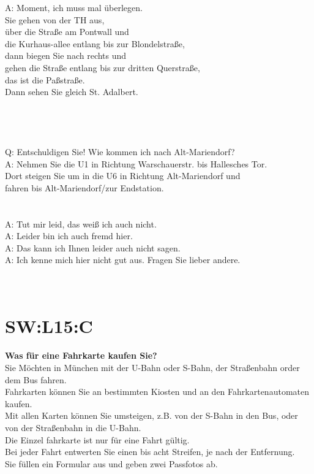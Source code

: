 A: Moment, ich muss mal überlegen. \\
Sie gehen von der TH aus, \\
über die Straße am Pontwall und \\
die Kurhaus-allee entlang bis zur Blondelstraße, \\
dann biegen Sie nach rechts und \\
gehen die Straße entlang bis zur dritten Querstraße, \\
das ist die Paßstraße. \\
Dann sehen Sie gleich St. Adalbert. \\
\\
\\
\noindent
\\
\\
Q: Entschuldigen Sie! Wie kommen ich nach Alt-Mariendorf? \\
A: Nehmen Sie die U1 in Richtung Warschauerstr. bis Hallesches Tor.  \\
Dort steigen Sie um in die U6 in Richtung Alt-Mariendorf und \\
fahren bis Alt-Mariendorf/zur Endstation.  \\
\\
\\
\noindent
A: Tut mir leid, das weiß ich auch nicht. \\
A: Leider bin ich auch fremd hier. \\
A: Das kann ich Ihnen leider auch nicht sagen. \\
A: Ich kenne mich hier nicht gut aus.  Fragen Sie lieber andere. \\
\\
\\

\section{SW:L15:C}
\textbf{Was für eine Fahrkarte kaufen Sie?} \\
Sie Möchten in München mit der U-Bahn oder S-Bahn, der Straßenbahn order dem Bus fahren. \\
Fahrkarten können Sie an bestimmten Kiosten und an den Fahrkartenautomaten kaufen.  \\
Mit allen Karten können Sie umsteigen, z.B. von der S-Bahn in den Bus, oder von der Straßenbahn in die U-Bahn. \\
Die Einzel fahrkarte ist nur für eine Fahrt gültig.  \\
Bei jeder Fahrt entwerten Sie einen bis acht Streifen,  je nach der Entfernung.  \\
Sie füllen ein Formular aus und geben zwei Passfotos ab. \\

